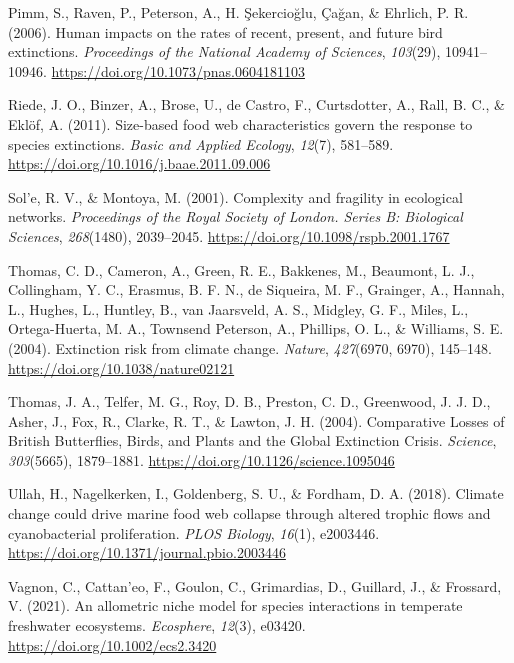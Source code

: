 \documentclass{article}
\newlength{\cslhangindent}
\newlength{\cslentryspacingunit} %
\newenvironment{CSLReferences}[2] %
 {%
  \setlength{\parindent}{0pt}
  \ifodd #1
  \let\oldpar\par
  \def\par{\hangindent=\cslhangindent\oldpar}
  \fi
  \setlength{\parskip}{#2\cslentryspacingunit}
 }%
 {}
\begin{document}
\begin{CSLReferences}{1}{0}
\leavevmode{}%
Pimm, S., Raven, P., Peterson, A., H. Şekercioğlu, Çağan, \& Ehrlich, P.
R. (2006). Human impacts on the rates of recent, present, and future
bird extinctions. \emph{Proceedings of the National Academy of
Sciences}, \emph{103}(29), 10941--10946.
\url{https://doi.org/10.1073/pnas.0604181103}

\leavevmode{}%
Riede, J. O., Binzer, A., Brose, U., de Castro, F., Curtsdotter, A.,
Rall, B. C., \& Eklöf, A. (2011). Size-based food web characteristics
govern the response to species extinctions. \emph{Basic and Applied
Ecology}, \emph{12}(7), 581--589.
\url{https://doi.org/10.1016/j.baae.2011.09.006}

\leavevmode{}%
Sol'e, R. V., \& Montoya, M. (2001). Complexity and fragility in
ecological networks. \emph{Proceedings of the Royal Society of London.
Series B: Biological Sciences}, \emph{268}(1480), 2039--2045.
\url{https://doi.org/10.1098/rspb.2001.1767}

\leavevmode{}%
Thomas, C. D., Cameron, A., Green, R. E., Bakkenes, M., Beaumont, L. J.,
Collingham, Y. C., Erasmus, B. F. N., de Siqueira, M. F., Grainger, A.,
Hannah, L., Hughes, L., Huntley, B., van Jaarsveld, A. S., Midgley, G.
F., Miles, L., Ortega-Huerta, M. A., Townsend Peterson, A., Phillips, O.
L., \& Williams, S. E. (2004). Extinction risk from climate change.
\emph{Nature}, \emph{427}(6970, 6970), 145--148.
\url{https://doi.org/10.1038/nature02121}

\leavevmode{}%
Thomas, J. A., Telfer, M. G., Roy, D. B., Preston, C. D., Greenwood, J.
J. D., Asher, J., Fox, R., Clarke, R. T., \& Lawton, J. H. (2004).
Comparative {Losses} of {British Butterflies}, {Birds}, and {Plants} and
the {Global Extinction Crisis}. \emph{Science}, \emph{303}(5665),
1879--1881. \url{https://doi.org/10.1126/science.1095046}

\leavevmode{}%
Ullah, H., Nagelkerken, I., Goldenberg, S. U., \& Fordham, D. A. (2018).
Climate change could drive marine food web collapse through altered
trophic flows and cyanobacterial proliferation. \emph{PLOS Biology},
\emph{16}(1), e2003446.
\url{https://doi.org/10.1371/journal.pbio.2003446}

\leavevmode{}%
Vagnon, C., Cattan'eo, F., Goulon, C., Grimardias, D., Guillard, J., \&
Frossard, V. (2021). An allometric niche model for species interactions
in temperate freshwater ecosystems. \emph{Ecosphere}, \emph{12}(3),
e03420. \url{https://doi.org/10.1002/ecs2.3420}


\end{CSLReferences}
\end{document}
